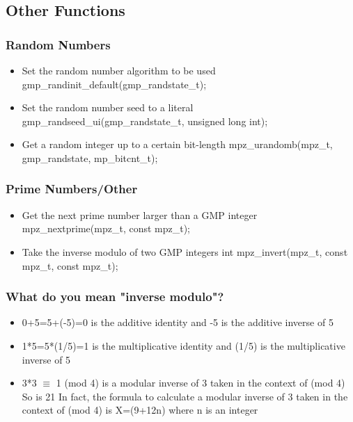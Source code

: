
\subsection{Other Functions}

\begin{frame}
\frametitle{Random Numbers}
  \begin{itemize}
    \item Set the random number algorithm to be used\break
    gmp\_randinit\_default(gmp\_randstate\_t);
    \item Set the random number seed to a literal\break
    gmp\_randseed\_ui(gmp\_randstate\_t, unsigned long int);
    \item Get a random integer up to a certain bit-length\break
    mpz\_urandomb(mpz\_t, gmp\_randstate, mp\_bitcnt\_t);
  \end{itemize}
\end{frame}

\begin{frame}
\frametitle{Prime Numbers/Other}
  \begin{itemize}
    \item Get the next prime number larger than a GMP integer\break
    mpz\_nextprime(mpz\_t, const mpz\_t);
    \item Take the inverse modulo of two GMP integers\break
    int mpz\_invert(mpz\_t, const mpz\_t, const mpz\_t);
  \end{itemize}
\end{frame}

\begin{frame}
\frametitle{What do you mean "inverse modulo"?}
  \begin{itemize}
    \item 0+5=5+(-5)=0 is the additive identity and -5 is the additive inverse of 5
    \item 1*5=5*(1/5)=1 is the multiplicative identity and (1/5) is the multiplicative inverse of 5
    \item 3*3 $\equiv$ 1 (mod 4) is a modular inverse of 3 taken in the context of (mod 4)\break
    So is 21\break
    In fact, the formula to calculate a modular inverse of 3 taken
    in the context of (mod 4) is X=(9+12n) where n is an integer
  \end{itemize}
\end{frame}

